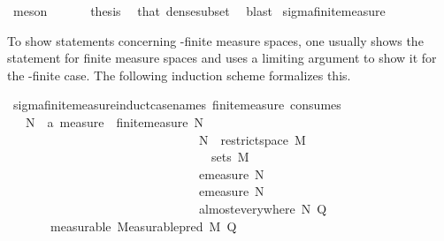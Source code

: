 \begin{isabellebody}
\ meson\isanewline
\ \ \isamarkupfalse%
\isanewline
\ \ \isamarkupfalse%
\ {\isacharquery}{\kern0pt}thesis\ \isamarkupfalse%
\ that\ dense{\isacharunderscore}{\kern0pt}subset\ \isamarkupfalse%
\ blast\isanewline
{}\isamarkupfalse%
%
\endisatagproof
{\isafoldproof}%
%
\isadelimproof
\isanewline
%
\endisadelimproof
\isanewline
{}\isamarkupfalse%
\ sigma{\isacharunderscore}{\kern0pt}finite{\isacharunderscore}{\kern0pt}measure\isanewline
{}%
\begin{isamarkuptext}%
To show statements concerning \isa{{\isasymsigma}}-finite measure spaces, one usually shows the statement for finite measure spaces and uses a limiting argument to show it for the \isa{{\isasymsigma}}-finite case.
      The following induction scheme formalizes this.%
\end{isamarkuptext}\isamarkuptrue%
\isamarkupfalse%
\ sigma{\isacharunderscore}{\kern0pt}finite{\isacharunderscore}{\kern0pt}measure{\isacharunderscore}{\kern0pt}induct{\isacharbrackleft}{\kern0pt}case{\isacharunderscore}{\kern0pt}names\ finite{\isacharunderscore}{\kern0pt}measure{\isacharcomma}{\kern0pt}\ consumes\ {}{\isacharbrackright}{\kern0pt}{\isacharcolon}{\kern0pt}\isanewline
\ \ \ {\isachardoublequoteopen}{\isasymAnd}{\isacharparenleft}{\kern0pt}N\ {\isacharcolon}{\kern0pt}{\isacharcolon}{\kern0pt}\ {\isacharprime}{\kern0pt}a\ measure{\isacharparenright}{\kern0pt}\ {\isasymOmega}{\isachardot}{\kern0pt}\ finite{\isacharunderscore}{\kern0pt}measure\ N\ \isanewline
\ \ \ \ \ \ \ \ \ \ \ \ \ \ \ \ \ \ \ \ \ \ \ \ \ \ \ \ \ \ {\isasymLongrightarrow}\ N\ {\isacharequal}{\kern0pt}\ restrict{\isacharunderscore}{\kern0pt}space\ M\ {\isasymOmega}\isanewline
\ \ \ \ \ \ \ \ \ \ \ \ \ \ \ \ \ \ \ \ \ \ \ \ \ \ \ \ \ \ {\isasymLongrightarrow}\ {\isasymOmega}\ {\isasymin}\ sets\ M\ \isanewline
\ \ \ \ \ \ \ \ \ \ \ \ \ \ \ \ \ \ \ \ \ \ \ \ \ \ \ \ \ \ {\isasymLongrightarrow}\ emeasure\ N\ {\isasymOmega}\ {\isasymnoteq}\ {\isasyminfinity}\ \isanewline
\ \ \ \ \ \ \ \ \ \ \ \ \ \ \ \ \ \ \ \ \ \ \ \ \ \ \ \ \ \ {\isasymLongrightarrow}\ emeasure\ N\ {\isasymOmega}\ {\isasymnoteq}\ {}\ \isanewline
\ \ \ \ \ \ \ \ \ \ \ \ \ \ \ \ \ \ \ \ \ \ \ \ \ \ \ \ \ \ {\isasymLongrightarrow}\ almost{\isacharunderscore}{\kern0pt}everywhere\ N\ Q{\isachardoublequoteclose}\isanewline
\ \ \ \ \ \ \ {\isacharbrackleft}{\kern0pt}measurable{\isacharbrackright}{\kern0pt}{\isacharcolon}{\kern0pt}\ {\isachardoublequoteopen}Measurable{\isachardot}{\kern0pt}pred\ M\ Q{\isachardoublequoteclose}\isanewline

\end{isabellebody}
